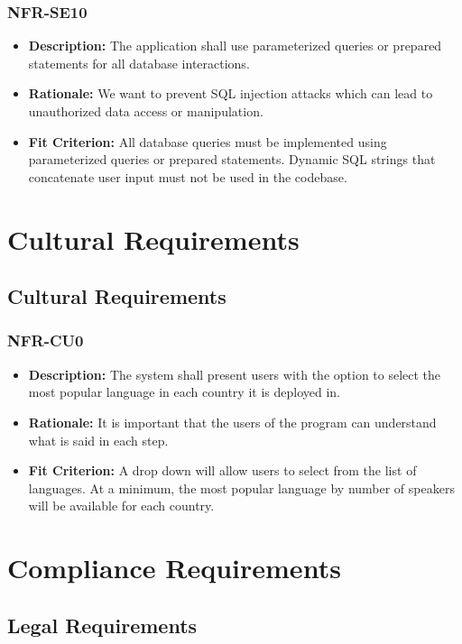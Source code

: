 \documentclass[12pt]{article}
\begin{document}
\subsubsection*{NFR-SE10}
\begin{itemize}
  \item \textbf{Description:} The application shall use parameterized queries or prepared statements for all database interactions.
  \item \textbf{Rationale:} We want to prevent SQL injection attacks which can lead to unauthorized data access or manipulation.
  \item \textbf{Fit Criterion:} All database queries must be implemented using parameterized queries or prepared statements. Dynamic SQL strings that concatenate user input must not be used in the codebase.
\end{itemize}

\section{Cultural Requirements}
\subsection{Cultural Requirements}
\subsubsection*{NFR-CU0}
\begin{itemize}
  \item \textbf{Description:} The system shall present users with the option to select the most popular language in each country it is deployed in.
  \item \textbf{Rationale:} It is important that the users of the program can understand what is said in each step.
  \item \textbf{Fit Criterion:} A drop down will allow users to select from the list of languages. At a minimum, the most popular language by number of speakers will be available for each country.
\end{itemize}

\section{Compliance Requirements}
\subsection{Legal Requirements}
\end{document}
